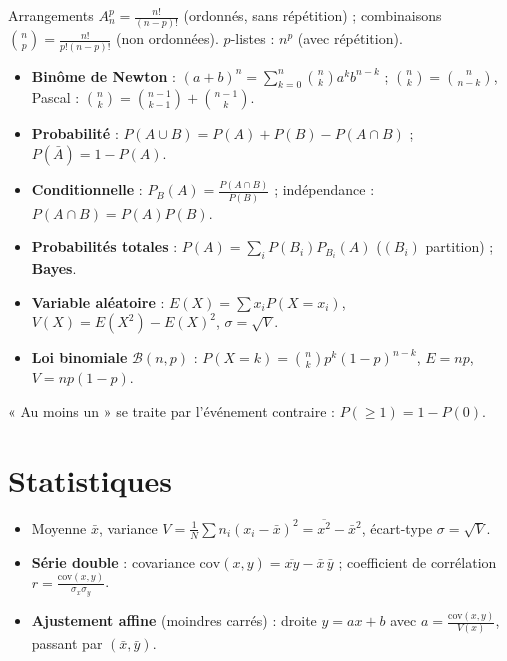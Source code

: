 \begin{aretenir}
Arrangements $A_n^p=\frac{n!}{(n-p)!}$ (ordonnés, sans répétition) ;
combinaisons $\binom np=\frac{n!}{p!(n-p)!}$ (non ordonnées). $p$-listes : $n^p$ (avec répétition).
\end{aretenir}

\begin{itemize}
\item \textbf{Binôme de Newton} : $(a+b)^n=\sum_{k=0}^n\binom nk a^k b^{n-k}$ ; $\binom nk=\binom n{n-k}$, Pascal : $\binom nk=\binom{n-1}{k-1}+\binom{n-1}k$.
\item \textbf{Probabilité} : $P(A\cup B)=P(A)+P(B)-P(A\cap B)$ ; $P(\bar A)=1-P(A)$.
\item \textbf{Conditionnelle} : $P_B(A)=\frac{P(A\cap B)}{P(B)}$ ; indépendance : $P(A\cap B)=P(A)P(B)$.
\item \textbf{Probabilités totales} : $P(A)=\sum_i P(B_i)P_{B_i}(A)$ ($(B_i)$ partition) ; \textbf{Bayes}.
\item \textbf{Variable aléatoire} : $E(X)=\sum x_iP(X{=}x_i)$, $V(X)=E(X^2)-E(X)^2$, $\sigma=\sqrt V$.
\item \textbf{Loi binomiale} $\mathcal B(n,p)$ : $P(X{=}k)=\binom nk p^k(1-p)^{n-k}$, $E=np$, $V=np(1-p)$.
\end{itemize}

\begin{remarque}
« Au moins un » se traite par l'événement contraire : $P(\ge1)=1-P(0)$.
\end{remarque}

\section{Statistiques}

\begin{itemize}
\item Moyenne $\bar x$, variance $V=\frac1N\sum n_i(x_i-\bar x)^2=\overline{x^2}-\bar x^2$, écart-type $\sigma=\sqrt V$.
\item \textbf{Série double} : covariance $\mathrm{cov}(x,y)=\overline{xy}-\bar x\,\bar y$ ; coefficient de corrélation $r=\frac{\mathrm{cov}(x,y)}{\sigma_x\sigma_y}$.
\item \textbf{Ajustement affine} (moindres carrés) : droite $y=ax+b$ avec $a=\frac{\mathrm{cov}(x,y)}{V(x)}$, passant par $(\bar x,\bar y)$.
\end{itemize}

